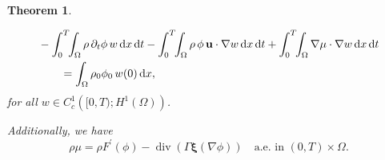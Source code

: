 \documentclass[11pt]{article}
\def\bq{\begin{equation}}
\def\eq{\end{equation}}
\def\bfu{\mathbf{u}}
\def\bfxi{\boldsymbol{\xi}}
\def\md{\mathrm{d}}
\def\bq{\begin{equation}}
\def\eq{\end{equation}}
\newtheorem{theorem}{Theorem}[section]
\begin{document}
\begin{theorem}
\begin{enumerate}
{\item \begin{align}
&- \int_0^T \!\!\int_{\Omega} \rho\, \partial_t \phi \, w \, \md x\, \md t
- \int_0^T \!\!\int_{\Omega} \rho\, \phi\, \bfu  \cdot \nabla w \, \md x\, \md t
+ \int_0^T \!\!\int_{\Omega} \nabla \mu \cdot \nabla w \, \md x\, \md t \notag \\
&\qquad
= \int_{\Omega} \rho_0 \phi_0 \, w(0) \, \md x ,
\end{align}
for all $w \in C_c^1\!\left([0,T); H^1(\Omega)\right)$.



}


\item Additionally, we have
\bq
\rho \mu = \rho F^{\prime} (\phi) - \operatorname{div}(\Gamma \mathbf{\bfxi}(\nabla\phi) ) \quad \text{a.e. in } (0,T) \times \Omega.
\eq
\end{enumerate}
\end{theorem}
\end{document}
